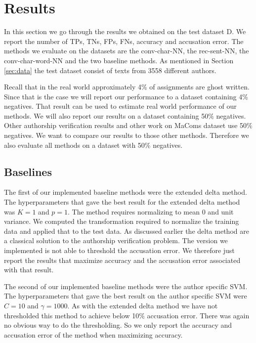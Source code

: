 \section{Results} \label{sec:results}

In this section we go through the results we obtained on the test dataset
\gls{D}. We report the number of \glspl{TP}, \glspl{TN}, \glspl{FP}, \glspl{FN},
accuracy and accusation error. The methods we evaluate on the datasets are the
\gls{conv-char-NN}, the \gls{rec-sent-NN}, the \gls{conv-char-word-NN} and the
two baseline methods. As mentioned in Section \ref{sec:data} the test dataset
consist of texts from 3558 different authors.

Recall that in the real world approximately 4\% of assignments are ghost
written. Since that is the case we will report our performance to a dataset
containing 4\% negatives. That result can be used to estimate real world
performance of our methods. We will also report our results on a dataset
containing 50\% negatives. Other authorship verification results and other work
on MaComs dataset use 50\% negatives. We want to compare our results to those
other methods. Therefore we also evaluate all methods on a dataset with 50\%
negatives.


\subsection{Baselines}

The first of our implemented baseline methods were the extended delta method.
The hyperparameters that gave the best result for the extended delta method
was $K = 1$ and $p = 1$. The method requires normalizing to mean 0 and unit
variance. We computed the transformation required to normalize the training
data and applied that to the test data. As discussed earlier the delta method
are a classical solution to the authorship verification problem. The version we
implemented is not able to threshold the accusation error. We therefore just
report the results that maximize accuracy and the accusation error associated
with that result.

The second of our implemented baseline methods were the author specific
\gls{SVM}. The hyperparameters that gave the best result on the author specific
\gls{SVM} were $C = 10$ and $\gamma = 1000$. As with the extended delta method
we have not thresholded this method to achieve below 10\% accusation error.
There was again no obvious way to do the thresholding. So we only report the
accuracy and accusation error of the method when maximizing accuracy.


